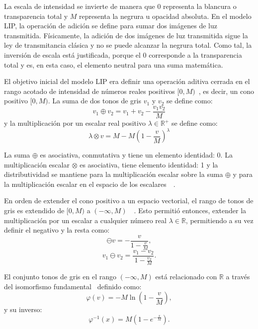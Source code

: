 La escala de intensidad se invierte de manera que 0 representa la blancura o transparencia total y $M$ representa la negrura u opacidad absoluta. En el modelo LIP, la operación de adición se define para sumar dos imágenes de luz transmitida. Físicamente, la adición de dos imágenes de luz transmitida sigue la ley de transmitancia clásica y no se puede alcanzar la negrura total. Como tal, la inversión de escala está justificada, porque el 0 corresponde a la transparencia total y es, en esta caso, el elemento neutral para una suma matemática.

El objetivo inicial del modelo LIP era definir una operación aditiva cerrada en el rango acotado de intensidad de números reales positivos $[0, M)$~\cite{jourlin1988model}, es decir, un cono positivo $[0, M )$. La suma de dos tonos de gris $v_1$ y $v_2$ se define como:
\begin{equation}
	v_1\oplus v_2=v_1+v_2-\frac{v_1v_2}{M}
\end{equation}
y la multiplicación por un escalar real positivo $\lambda \in \mathbb{R}^+$ se define como:
\begin{equation}
	\lambda \otimes v = M - M\left(1-\frac{v}{M}\right)^\lambda
\end{equation}

La suma $\oplus$ es asociativa, conmutativa y tiene un elemento identidad: 0. La multiplicaci\'on escalar $\otimes$ es asociativa, tiene elemento identidad: 1 y la distributividad se mantiene para la multiplicación escalar sobre la suma $\oplus$ y para la multiplicación escalar en el espacio de los escalares~\cite{jourlin1988model}~\cite{jourlin2016logarithmic}.

En orden de extender el cono positivo a un espacio vectorial, el rango de tonos de gris es extendido de $[0,M)$ a $(-\infty,M)$~\cite{jourlin1988model}~\cite{jourlin2016logarithmic}. Esto permiti\'o entonces, extender la multiplicaci\'on por un escalar a cualquier n\'umero real $\lambda \in \mathbb{R}$, permitiendo a su vez definir el negativo y la resta como:
\begin{equation}
	\ominus v=-\frac{v}{1-\frac{v}{M}},
\end{equation}
\begin{equation}
	v_1 \ominus v_2 = \frac{v_1-v_2}{1-\frac{v_2}{M}}.
\end{equation}

El conjunto tonos de gris en el rango $(-\infty, M)$ está relacionado con $\mathbb{R}$ a través del isomorfismo fundamental~\cite{jourlin2016logarithmic} definido como:
\begin{equation}
	\varphi(v) = -M\ln\left(1-\frac{v}{M}\right),
\end{equation}
y su inverso:
\begin{equation}
	\varphi^{-1} (x) = M\left(1-e^{-\frac{x}{M}}\right).
\end{equation}

